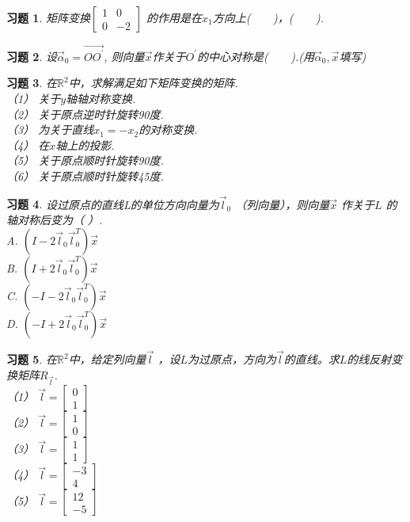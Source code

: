 \documentclass[a4paper]{book}
\newtheorem{ex}{习题}[chapter]
\begin{document}
\begin{ex}\label{8.3}
矩阵变换$\begin{bmatrix}1&0\\0&-2\end{bmatrix}$ 的作用是在$x_1$方向上(~~~~)，(~~~~).
\end{ex}

\begin{ex}\label{8.4}
设$\vec{\alpha}_0=\vec{OO^{'}}$, 则向量$\vec{x}$作关于$O^{'}$的中心对称是(~~~~).(用$\vec{\alpha}_0,\vec{x}$填写)
\end{ex}

\begin{ex}\label{8.5}
在$\mathbb{R}^2$中，求解满足如下矩阵变换的矩阵.\\
（1） 关于$y$轴轴对称变换.\\
（2） 关于原点逆时针旋转90度.\\
（3） 为关于直线$x_1=-x_2$的对称变换.\\
（4） 在$x$轴上的投影.\\
（5） 关于原点顺时针旋转90度.\\
（6） 关于原点顺时针旋转45度.
\end{ex}

\begin{ex}\label{8.6}
设过原点的直线L的单位方向向量为$\vec{l}_0$ （列向量），则向量$\vec{x}$ 作关于$L$ 的轴对称后变为（     ）.\\
A. $(I-2\vec{l}_0 \vec{l}_0^T )\vec{x}$  \\
B. $(I+2\vec{l}_0 \vec{l}_0^T )\vec{x}$\\
C. $(-I-2\vec{l}_0 \vec{l}_0^T )\vec{x}$  \\
D. $(-I+2\vec{l}_0 \vec{l}_0^T )\vec{x}$
\end{ex}

\begin{ex}\label{8.7}
在$\mathbb{R}^2$中，给定列向量$\vec{l}$ ，设$L$为过原点，方向为$\vec{l}$的直线。求$L$的线反射变换矩阵$R_{\vec{l}}$.\\
（1） $\vec{l}=\begin{bmatrix}0\\1\end{bmatrix}$\\
（2） $\vec{l}=\begin{bmatrix}1\\0\end{bmatrix}$\\
（3） $\vec{l}=\begin{bmatrix}1\\1\end{bmatrix}$\\
（4） $\vec{l}=\begin{bmatrix}-3\\4\end{bmatrix}$\\
（5） $\vec{l}=\begin{bmatrix}12\\-5\end{bmatrix}$
\end{ex}
\end{document}
